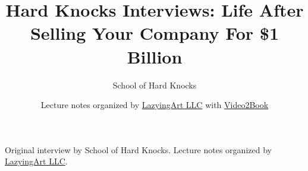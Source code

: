 \documentclass[11pt,oneside]{book}
\begin{document}
\frontmatter
\title{Hard Knocks Interviews: Life After Selling Your Company For \$1 Billion}
\author{School of Hard Knocks}
\date{Lecture notes organized by \href{https://lazying.art}{LazyingArt LLC} with \href{https://github.com/lachlanchen/Video2Book}{Video2Book}}
\maketitle
\begin{center}
\small Original interview by School of Hard Knocks. Lecture notes organized by \href{https://lazying.art}{LazyingArt LLC}.
\end{center}
\clearpage
\mainmatter

\end{document}
